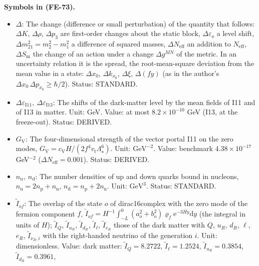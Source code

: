 \documentclass[
  10pt,
]{article}
\providecommand{\tightlist}{%
  \setlength{\itemsep}{0pt}\setlength{\parskip}{0pt}}
\begin{document}
\textbf{Symbols in (FE-73).}

\begin{itemize}
\tightlist
\item
  \(\Delta\): The change (difference or small perturbation) of the
  quantity that follows: \(\Delta K\), \(\Delta\rho\), \(\Delta p_3\)
  are first-order changes about the static block,
  \(\Delta\varepsilon_o\) a level shift,
  \(\Delta m^2_{21} = m_2^2 - m_1^2\) a difference of squared masses,
  \(\Delta N_{\mathrm{eff}}\) an addition to \(N_{\mathrm{eff}}\),
  \(\Delta S_{\mathrm{m}}\) the change of an action under a change
  \(\Delta g^{MN}\) of the metric. In an uncertainty relation it is the
  spread, the root-mean-square deviation from the mean value in a state:
  \(\Delta x_0\), \(\Delta k_{x_0}\), \(\Delta\xi\), \(\Delta(fy)\) (as
  in the author's \(\Delta x_0\,\Delta p_{x_0} \ge \hbar/2\)). Status:
  STANDARD.
\item
  \(\Delta\varepsilon_{\mathrm{I11}},\ \Delta\varepsilon_{\mathrm{I13}}\):
  The shifts of the dark-matter level by the mean fields of I11 and of
  I13 in matter. Unit: GeV. Value: at most \(8.2\times10^{-10}\) GeV
  (I13, at the freeze-out). Status: DERIVED.
\item
  \(G_{\mathrm{V}}\): The four-dimensional strength of the vector portal
  I11 on the zero modes,
  \(G_{\mathrm{V}} = c_{\mathrm{V}}H/(2f^4v_{\mathrm{t}}\Lambda_\star^6)\).
  Unit: \(\mathrm{GeV}^{-2}\). Value: benchmark \(4.38\times10^{-17}\)
  GeV\(^{-2}\) (\(\Delta N_{\mathrm{eff}} = 0.001\)). Status: DERIVED.
\item
  \(n_{\mathrm{u}},\ n_{\mathrm{d}}\): The number densities of up and
  down quarks bound in nucleons,
  \(n_{\mathrm{u}} = 2n_{\mathrm{p}} + n_{\mathrm{n}}\),
  \(n_{\mathrm{d}} = n_{\mathrm{p}} + 2n_{\mathrm{n}}\). Unit:
  \(\mathrm{GeV}^{3}\). Status: STANDARD.
\item
  \(\tilde I_{of}\): The overlap of the state \(o\) of dirac16complex
  with the zero mode of the fermion component \(f\),
  \(\tilde I_{of} = H^{-1}\int_{-L}^{0}(a_o^2 + b_o^2)\varrho_f\mathrm{e}^{-3Hy}\mathrm{d}y\)
  (the integral in units of \(H\)); \(\tilde I_Q\), \(\tilde I_{u_R}\),
  \(\tilde I_{d_R}\), \(\tilde I_\ell\), \(\tilde I_{e_R}\) those of the
  dark matter with \(Q\), \(u_R\), \(d_R\), \(\ell\), \(e_R\),
  \(\tilde I_{\nu_R,i}\) with the right-handed neutrino of the
  generation \(i\). Unit: dimensionless. Value: dark matter:
  \(\tilde I_Q = 8.2722\), \(\tilde I_\ell = 1.2524\),
  \(\tilde I_{u_R} = 0.3854\), \(\tilde I_{d_R} = 0.3961\),

\end{itemize}
\end{document}
